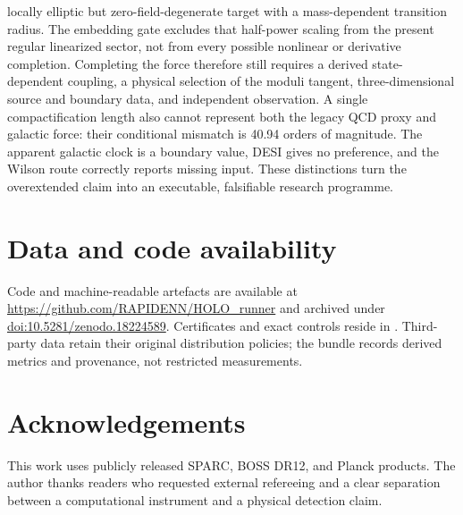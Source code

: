 \documentclass[10pt]{article}
\begin{document}
locally elliptic but zero-field-degenerate target with a mass-dependent
transition radius.  The embedding gate excludes that half-power scaling from
the present regular linearized sector, not from every possible nonlinear or
derivative completion.  Completing the force therefore still requires a
derived state-dependent coupling, a physical selection of the moduli tangent,
three-dimensional source and boundary data, and independent observation.  A
single compactification length also cannot represent both the legacy QCD proxy
and galactic force: their conditional mismatch is 40.94 orders of magnitude.
The apparent galactic clock is a boundary value, DESI gives no preference, and
the Wilson route correctly reports missing input.  These distinctions turn the
overextended claim into an executable, falsifiable research programme.

\section*{Data and code availability}

Code and machine-readable artefacts are available at
\url{https://github.com/RAPIDENN/HOLO_runner} and archived under
\href{https://doi.org/10.5281/zenodo.18224589}{doi:10.5281/zenodo.18224589}.
Certificates and exact controls reside in .
Third-party data retain their original distribution policies; the bundle
records derived metrics and provenance, not restricted measurements.

\section*{Acknowledgements}

This work uses publicly released SPARC, BOSS DR12, and Planck products.  The
author thanks readers who requested external refereeing and a clear separation
between a computational instrument and a physical detection claim.
\end{document}
